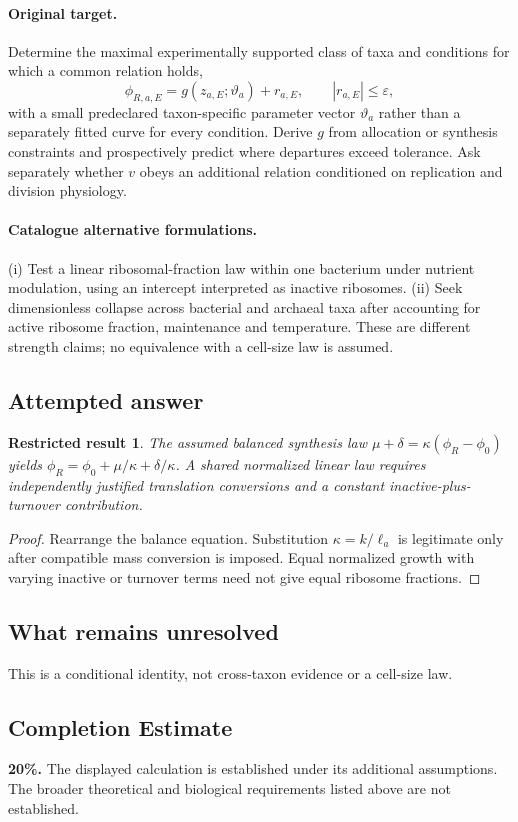 \documentclass[11pt]{article}
\newtheorem{attemptresult}{Restricted result}[section]
\begin{document}
\paragraph{Original target.}
Determine the maximal experimentally supported class of taxa and conditions for which a common relation holds,
\[\phi_{R,a,E}=g(z_{a,E};\vartheta_a)+r_{a,E},\qquad |r_{a,E}|\le\varepsilon,\]
with a small predeclared taxon-specific parameter vector $\vartheta_a$ rather than a separately fitted curve for every condition. Derive $g$ from allocation or synthesis constraints and prospectively predict where departures exceed tolerance. Ask separately whether $v$ obeys an additional relation conditioned on replication and division physiology.
\paragraph{Catalogue alternative formulations.}
(i) Test a linear ribosomal-fraction law within one bacterium under nutrient modulation, using an intercept interpreted as inactive ribosomes. (ii) Seek dimensionless collapse across bacterial and archaeal taxa after accounting for active ribosome fraction, maintenance and temperature. These are different strength claims; no equivalence with a cell-size law is assumed.
\subsection{Attempted answer}
\begin{attemptresult}
The assumed balanced synthesis law $\mu+\delta=\kappa(\phi_R-\phi_0)$ yields $\phi_R=\phi_0+\mu/\kappa+\delta/\kappa$. A shared normalized linear law requires independently justified translation conversions and a constant inactive-plus-turnover contribution.
\end{attemptresult}
\begin{proof}
Rearrange the balance equation. Substitution $\kappa=k/\ell_a$ is legitimate only after compatible mass conversion is imposed. Equal normalized growth with varying inactive or turnover terms need not give equal ribosome fractions.
\end{proof}
\subsection{What remains unresolved}
This is a conditional identity, not cross-taxon evidence or a cell-size law.
\subsection{Completion Estimate}
\textbf{20\%.} The displayed calculation is established under its additional assumptions. The broader theoretical and biological requirements listed above are not established.
\end{document}

